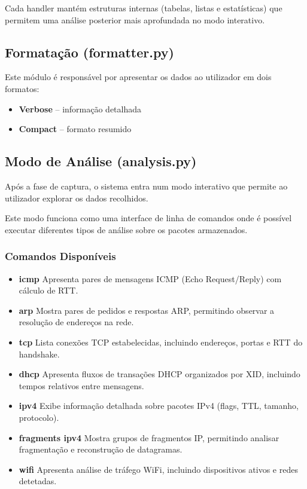 \documentclass[a4paper,12pt]{article}
\begin{document}
Cada handler mantém estruturas internas (tabelas, listas e estatísticas) que permitem uma análise posterior mais aprofundada no modo interativo.

\subsection{Formatação (formatter.py)}

Este módulo é responsável por apresentar os dados ao utilizador em dois formatos:

\begin{itemize}
    \item \textbf{Verbose} – informação detalhada
    \item \textbf{Compact} – formato resumido
\end{itemize}

\subsection{Modo de Análise (analysis.py)}

Após a fase de captura, o sistema entra num modo interativo que permite ao utilizador explorar os dados recolhidos.

Este modo funciona como uma interface de linha de comandos onde é possível executar diferentes tipos de análise sobre os pacotes armazenados.

\subsubsection*{Comandos Disponíveis}

\begin{itemize}

\item \textbf{icmp}  
Apresenta pares de mensagens ICMP (Echo Request/Reply) com cálculo de RTT.

\item \textbf{arp}  
Mostra pares de pedidos e respostas ARP, permitindo observar a resolução de endereços na rede.

\item \textbf{tcp}  
Lista conexões TCP estabelecidas, incluindo endereços, portas e RTT do handshake.

\item \textbf{dhcp}  
Apresenta fluxos de transações DHCP organizados por XID, incluindo tempos relativos entre mensagens.

\item \textbf{ipv4}  
Exibe informação detalhada sobre pacotes IPv4 (flags, TTL, tamanho, protocolo).

\item \textbf{fragments ipv4}  
Mostra grupos de fragmentos IP, permitindo analisar fragmentação e reconstrução de datagramas.

\item \textbf{wifi}  
Apresenta análise de tráfego WiFi, incluindo dispositivos ativos e redes detetadas.

\end{itemize}
\end{document}
